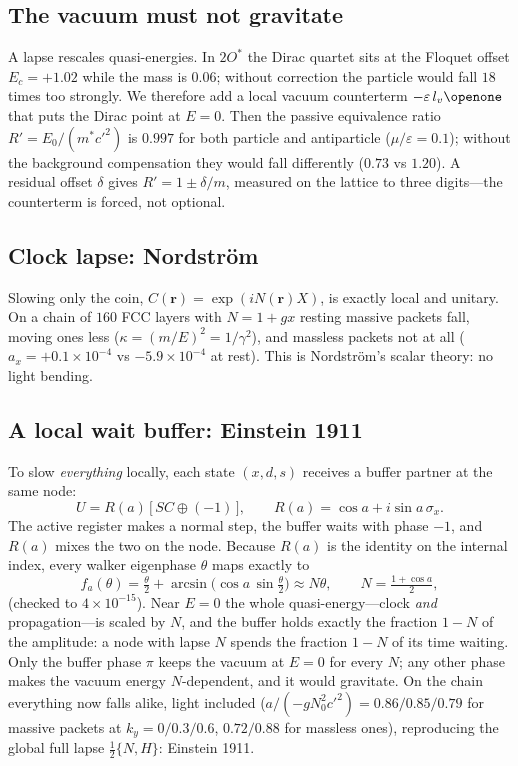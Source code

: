 \documentclass[twocolumn,showpacs,preprintnumbers,amsmath,amssymb]{revtex4-2}
\newcommand{\eps}{\varepsilon}
\newcommand{\cpr}{c'}
\newcommand{\Ots}{2O^{*}}
\newcommand{\rvec}{\mathbf{r}}
\begin{document}
\subsection{The vacuum must not gravitate}

A lapse rescales quasi-energies.
In $\Ots$ the Dirac quartet sits at the Floquet offset $E_c=+1.02$ while the
mass is $0.06$; without correction the particle would fall $18$ times too
strongly.
We therefore add a local vacuum counterterm $-\eps\,l_v\openone$ that puts
the Dirac point at $E=0$.
Then the passive equivalence ratio $R'=E_0/(m^{*}\cpr^{2})$ is $0.997$ for both
particle and antiparticle ($\mu/\eps=0.1$); without the background
compensation they would fall differently ($0.73$ vs $1.20$).
A residual offset $\delta$ gives $R'=1\pm\delta/m$, measured on the lattice to
three digits---the counterterm is forced, not optional.

\subsection{Clock lapse: Nordstr\"om}

Slowing only the coin, $C(\rvec)=\exp(iN(\rvec)X)$, is exactly local and unitary.
On a chain of $160$ FCC layers with $N=1+gx$ resting massive packets fall,
moving ones less ($\kappa=(m/E)^{2}=1/\gamma^{2}$), and massless packets not
at all ($a_x=+0.1\times10^{-4}$ vs $-5.9\times10^{-4}$ at rest).
This is Nordstr\"om's scalar theory: no light bending.

\subsection{A local wait buffer: Einstein 1911}

To slow \emph{everything} locally, each state $(x,d,s)$ receives a buffer
partner at the same node:
\begin{equation}
  U = R(a)\,\big[\,S C \oplus (-1)\,\big],\qquad
  R(a)=\cos a+i\sin a\,\sigma_x .
  \label{eq:buffer}
\end{equation}
The active register makes a normal step, the buffer waits with phase $-1$, and
$R(a)$ mixes the two on the node.
Because $R(a)$ is the identity on the internal index, every walker eigenphase
$\theta$ maps exactly to
\begin{equation}
  f_a(\theta)=\tfrac{\theta}{2}+\arcsin\!\big(\cos a\,\sin\tfrac{\theta}{2}\big)
  \approx N\theta,\qquad N=\tfrac{1+\cos a}{2},
\end{equation}
(checked to $4\times10^{-15}$).
Near $E=0$ the whole quasi-energy---clock \emph{and} propagation---is scaled by
$N$, and the buffer holds exactly the fraction $1-N$ of the amplitude: a node
with lapse $N$ spends the fraction $1-N$ of its time waiting.
Only the buffer phase $\pi$ keeps the vacuum at $E=0$ for every $N$; any other
phase makes the vacuum energy $N$-dependent, and it would gravitate.
On the chain everything now falls alike, light included
($a/(-gN_0^{2}\cpr^{2})=0.86/0.85/0.79$ for massive packets at
$k_y=0/0.3/0.6$, $0.72/0.88$ for massless ones), reproducing the global full
lapse $\tfrac12\{N,H\}$: Einstein 1911.
\end{document}

